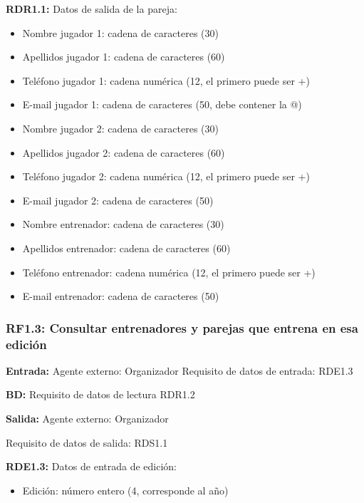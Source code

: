 \textbf{RDR1.1:} Datos de salida de la pareja:
\begin{itemize}
	\item Nombre jugador 1: cadena de caracteres (30)
	\item Apellidos jugador 1: cadena de caracteres (60)
	\item Teléfono jugador 1: cadena numérica (12, el primero puede ser +)
	\item E-mail jugador 1: cadena de caracteres (50, debe contener la @)
\newline
	\item Nombre jugador 2: cadena de caracteres (30)
	\item Apellidos jugador 2: cadena de caracteres (60)
	\item Teléfono jugador 2: cadena numérica (12, el primero puede ser  +)
	\item E-mail jugador 2: cadena de caracteres (50)
\newline
	\item Nombre entrenador: cadena de caracteres (30)
	\item Apellidos entrenador: cadena de caracteres (60)
	\item Teléfono entrenador: cadena numérica (12, el primero puede ser +)
	\item E-mail entrenador: cadena de caracteres (50)
\end{itemize}

\subsubsection{RF1.3: Consultar entrenadores y parejas que entrena en esa edición}

\textbf{Entrada:} Agente externo: Organizador    Requisito de datos de entrada: RDE1.3

\textbf{BD:} Requisito de datos de lectura RDR1.2

\textbf{Salida:} Agente externo: Organizador

Requisito de datos de salida: RDS1.1

\textbf{RDE1.3:} Datos de entrada de edición:
\begin{itemize}
	\item Edición: número entero (4, corresponde al año)
\end{itemize}

